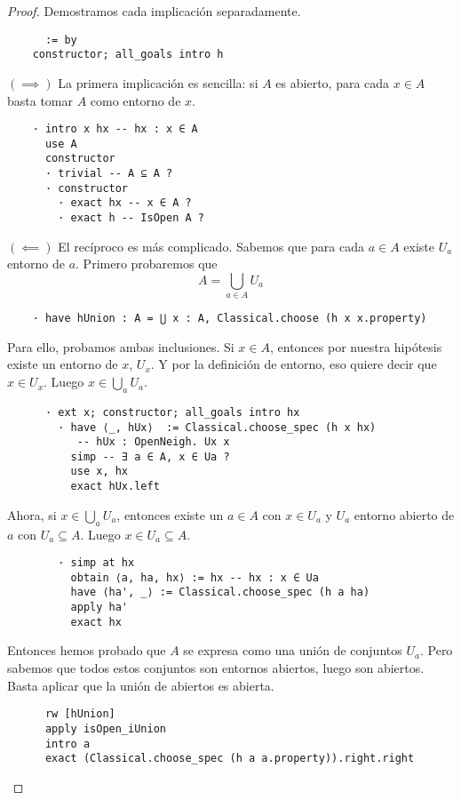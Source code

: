 \begin{proof}
  Demostramos cada implicación separadamente.

  \begin{lstlisting}
      := by
    constructor; all_goals intro h \end{lstlisting}

  $(\implies)$ La primera implicación es sencilla: si $A$ es abierto, para cada $x \in A$ basta tomar $A$ como entorno de $x$.

  \begin{lstlisting}
    · intro x hx -- hx : x ∈ A
      use A
      constructor
      · trivial -- A ⊆ A ?
      · constructor
        · exact hx -- x ∈ A ?
        · exact h -- IsOpen A ? \end{lstlisting}

  $(\impliedby)$ El recíproco es más complicado. Sabemos que para cada $a \in A$ existe $U_a$ entorno de $a$. Primero probaremos que
  $$
  A = \bigcup_{a \in A} U_a
  $$
  \begin{lstlisting}
    · have hUnion : A = ⋃ x : A, Classical.choose (h x x.property) \end{lstlisting}
  Para ello, probamos ambas inclusiones. Si $x \in A$, entonces por nuestra hipótesis existe un entorno de $x$, $U_x$. Y por la definición de entorno, eso quiere decir que $x \in U_x$. Luego $x \in \bigcup_{a}U_a$.

  \begin{lstlisting}
      · ext x; constructor; all_goals intro hx
        · have ⟨_, hUx⟩  := Classical.choose_spec (h x hx)
           -- hUx : OpenNeigh. Ux x
          simp -- ∃ a ∈ A, x ∈ Ua ?
          use x, hx
          exact hUx.left \end{lstlisting}

  Ahora, si $x \in \bigcup_{a}U_a$, entonces existe un $a \in A$ con $x \in U_a$ y $U_a$ entorno abierto de $a$ con $U_a \subseteq A$. Luego $x \in U_a \subseteq A$.

  \begin{lstlisting}
        · simp at hx
          obtain ⟨a, ha, hx⟩ := hx -- hx : x ∈ Ua
          have ⟨ha', _⟩ := Classical.choose_spec (h a ha)
          apply ha'
          exact hx \end{lstlisting}
  
  Entonces hemos probado que $A$ se expresa como una unión de conjuntos $U_a$. Pero sabemos que todos estos conjuntos son entornos abiertos, luego son abiertos. Basta aplicar que la unión de abiertos es abierta.

  \begin{lstlisting}
      rw [hUnion]
      apply isOpen_iUnion
      intro a
      exact (Classical.choose_spec (h a a.property)).right.right \end{lstlisting}
\end{proof}


